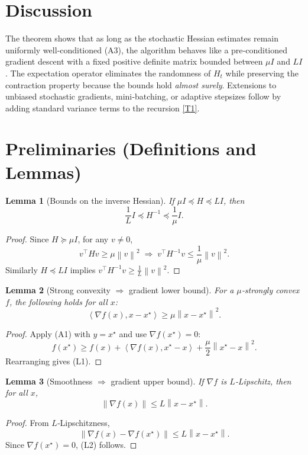 \documentclass{article}
\newtheorem{lemma}{Lemma}
\newcommand{\norm}[1]{\left\lVert #1\right\rVert}
\newcommand{\ip}[2]{\left\langle #1,#2\right\rangle}
\begin{document}
\section*{Discussion}
The theorem shows that as long as the stochastic Hessian estimates remain
uniformly well‑conditioned (A3), the algorithm behaves like a pre‑conditioned
gradient descent with a fixed positive definite matrix bounded between $\mu I$
and $L I$.  The expectation operator eliminates the randomness of $H_t$ while
preserving the contraction property because the bounds hold \emph{almost
surely}.  Extensions to unbiased stochastic gradients, mini‑batching, or
adaptive stepsizes follow by adding standard variance terms to the recursion
\eqref{T1}.

\newpage
\section*{Preliminaries (Definitions and Lemmas)}
\begin{lemma}[Bounds on the inverse Hessian]\label{lem:inv}
If $\mu I\preceq H\preceq L I$, then
\[
   \frac{1}{L} I\preceq H^{-1}\preceq \frac{1}{\mu} I .
\]
\end{lemma}
\begin{proof}
Since $H\succeq\mu I$, for any $v\neq0$,
\[
   v^{\!\top}Hv\ge\mu\norm{v}^{2}\;\Longrightarrow\;
   v^{\!\top}H^{-1}v\le\frac{1}{\mu}\norm{v}^{2}.
\]
Similarly $H\preceq L I$ implies $v^{\!\top}H^{-1}v\ge\frac{1}{L}\norm{v}^{2}$.
\end{proof}

\begin{lemma}[Strong convexity $\Rightarrow$ gradient lower bound]\label{lem:sc}
For a $\mu$‑strongly convex $f$, the following holds for all $x$:
\[
   \ip{\nabla f(x)}{x-x^{\star}}\ge\mu\norm{x-x^{\star}}^{2}. \tag{L1}
\]
\end{lemma}
\begin{proof}
Apply (A1) with $y=x^{\star}$ and use $\nabla f(x^{\star})=0$:
\[
   f(x^{\star})\ge f(x)+\ip{\nabla f(x)}{x^{\star}-x}+\frac{\mu}{2}\norm{x^{\star}-x}^{2}.
\]
Rearranging gives (L1).
\end{proof}

\begin{lemma}[Smoothness $\Rightarrow$ gradient upper bound]\label{lem:smooth}
If $\nabla f$ is $L$‑Lipschitz, then for all $x$,
\[
   \norm{\nabla f(x)}\le L\norm{x-x^{\star}}. \tag{L2}
\]
\end{lemma}
\begin{proof}
From $L$‑Lipschitzness,
\[
   \norm{\nabla f(x)-\nabla f(x^{\star})}\le L\norm{x-x^{\star}}.
\]
Since $\nabla f(x^{\star})=0$, (L2) follows.
\end{proof}
\end{document}
